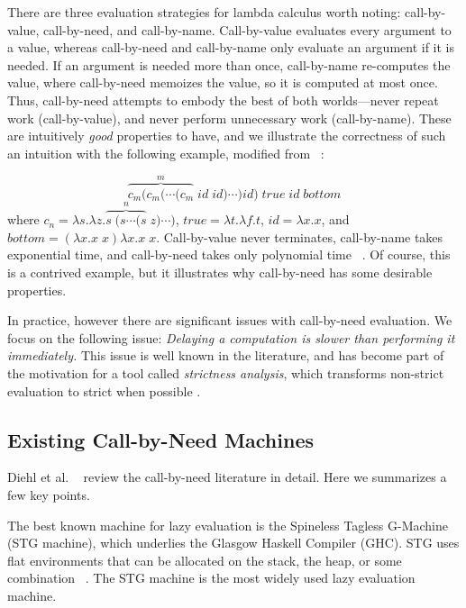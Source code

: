 There are three evaluation strategies for lambda calculus worth noting:
call-by-value, call-by-need, and call-by-name.  Call-by-value evaluates every argument
to a value, whereas call-by-need and call-by-name only evaluate an argument if
it is needed.  If an argument is needed more than once, call-by-name re-computes
the value, where call-by-need memoizes the value, so it is computed at most once.
Thus, call-by-need attempts to embody the best of both worlds---never repeat
work (call-by-value), and never perform unnecessary work (call-by-name). These
are intuitively \emph{good} properties to have, and we illustrate the
correctness of such an intuition with the following example, modified from
~\cite{danvy2013synthetic}:

$$ \overbrace{c_m (c_m (\cdots(c_m}^{m} \; id \;  id)\cdots) id) \; true \; id
\; bottom $$ where $c_n = \lambda s.\lambda z.\overbrace{s \; (s \cdots (s}^{n}
\; z) \cdots) $, $true = \lambda t.\lambda f.t$, $id=\lambda x.x$, and $bottom =
(\lambda x.x \; x) \lambda x.x \; x$. Call-by-value never terminates,
call-by-name takes exponential time, and call-by-need takes only polynomial time
~\cite{danvy2013synthetic}. Of course, this is a contrived example, but it
illustrates why call-by-need has some desirable properties.

In practice, however there are significant issues with call-by-need evaluation.
We focus on the following issue: \emph{Delaying a computation is slower than
performing it immediately.} This issue is well known in the literature, and has
become part of the motivation for a tool called \emph{strictness analysis},
which transforms non-strict evaluation to strict when possible
\cite{mycroft1982abstract,wadler1987projections}. 

\subsection{Existing Call-by-Need Machines}

Diehl et al. ~\cite{diehl2000abstract} review the call-by-need
literature in detail.  Here we summarizes a few key points.

The best known machine for lazy evaluation is the Spineless Tagless
G-Machine (STG machine), which underlies the Glasgow Haskell Compiler (GHC). 
STG uses flat environments that can be allocated on the stack, the heap,
or some combination ~\cite{jonesstg}. The STG machine is the
most widely used lazy evaluation machine. 

